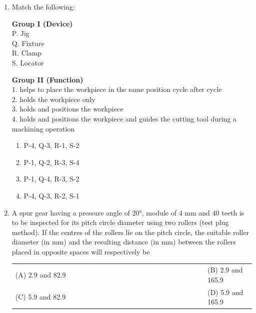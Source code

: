 \documentclass[a4paper,12pt]{article}
\begin{document}
\begin{enumerate}[label=Q.\arabic*, leftmargin=*]
\noindent 
\item Match the following:

\vspace{0.5em}

\noindent
\begin{minipage}[t]{0.45\textwidth}
\textbf{Group I (Device)}\\[0.5em]
P. Jig \\
Q. Fixture \\
R. Clamp \\
S. Locator
\end{minipage}
\hfill
\begin{minipage}[t]{0.45\textwidth}
\textbf{Group II (Function)}\\[0.5em]
1. helps to place the workpiece in the same position cycle after cycle \\
2. holds the workpiece only \\
3. holds and positions the workpiece \\
4. holds and positions the workpiece and guides the cutting tool during a machining operation
\end{minipage}

\vspace{1em}

\begin{multicols}{2}
\begin{enumerate}[label=(\Alph*)]
    \item P-4, Q-3, R-1, S-2
    \item P-1, Q-2, R-3, S-4
    \item P-1, Q-4, R-3, S-2
    \item P-4, Q-3, R-2, S-1
\end{enumerate}
\end{multicols}

\item A spur gear having a pressure angle of 20°, module of 4 mm and 40 teeth is to be inspected for its pitch circle diameter using two rollers (test plug method). If the centres of the rollers lie on the pitch circle, the suitable roller diameter (in mm) and the resulting distance (in mm) between the rollers placed in opposite spaces will respectively be
\begin{multicols}{2}
\begin{tabular}[t]{p{0.8\linewidth} p{0.9\linewidth}}
(A) 2.9 and 82.9 & (B) 2.9 and 165.9 \\
(C) 5.9 and 82.9 & (D) 5.9 and 165.9 \\
\end{tabular}
\end{multicols}


\end{enumerate}
\end{document}

